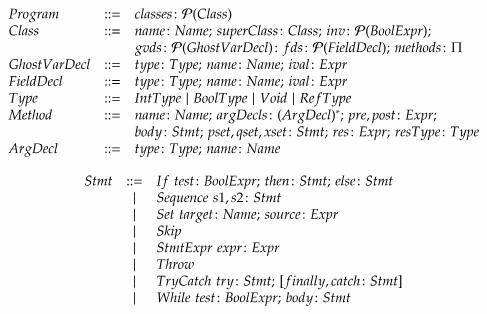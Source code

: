 \documentclass[a4paper,10pt]{article}
\begin{document}
\renewcommand{\arraystretch}{1.3}
\setlength{\arraycolsep}{.5\arraycolsep}
\begin{displaymath}
\begin{array}[l]{lcl}
Program         & \geqdef & classes \gcolon \powerset(Class)\\
Class           & \geqdef & name \gcolon Name \gsemi superClass \gcolon Class \gsemi inv \gcolon
\powerset(BoolExpr);\\
                &         & gvds \gcolon \powerset(GhostVarDecl) \gcolon fds \gcolon \powerset(FieldDecl)
\gsemi methods \gcolon \Methods\\
GhostVarDecl    & \geqdef & type \colon Type\gsemi name \colon Name\gsemi ival \colon Expr\\
FieldDecl       & \geqdef & type \gcolon Type\gsemi name \gcolon Name\gsemi ival \gcolon Expr\\
Type            & \geqdef & IntType \gbar BoolType \gbar Void \gbar RefType\\
Method          & \geqdef & name \gcolon Name\gsemi argDecls \gcolon (ArgDecl)^*\gsemi pre, post \gcolon
Expr \gsemi\\
                &         & body \gcolon Stmt \gsemi pset, qset, xset \gcolon Stmt \gsemi res \gcolon Expr
\gsemi resType \gcolon Type\\
ArgDecl         & \geqdef & type \gcolon Type\gsemi name \gcolon Name\\
\end{array}
\end{displaymath}

\begin{displaymath}
\begin{array}[l]{lcl}
Stmt   & \geqdef & If\,\, test \gcolon BoolExpr\gsemi then \gcolon Stmt\gsemi else \gcolon
Stmt\\
            & \gbar   & Sequence\,\, s1, s2 \gcolon Stmt\\
            & \gbar   & Set\,\, target \gcolon Name\gsemi source \gcolon Expr\\
            & \gbar   & Skip\\
            & \gbar   & StmtExpr\,\, expr \gcolon Expr\\
            & \gbar   & Throw\\
            & \gbar   & TryCatch\,\, try \gcolon Stmt\gsemi [finally, catch \gcolon Stmt]\\
            & \gbar   & While\,\, test \gcolon BoolExpr\gsemi body \gcolon Stmt\\
\end{array}
\end{displaymath}
\end{document}
